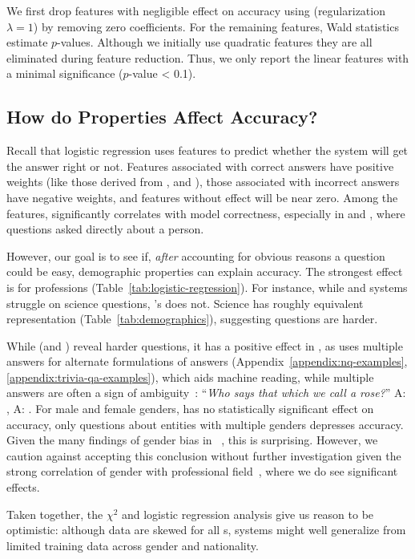 We first drop features with negligible effect on accuracy using \lasso{} (regularization $\lambda=1$) by removing  zero coefficients.
For the remaining features, Wald statistics~\cite{fahrmeir2007regression} estimate $p$-values. 
Although we initially use quadratic features they are all eliminated during feature reduction.
Thus, we only report the linear features with a minimal significance ($p$-value < 0.1).



\subsection{How do Properties Affect Accuracy?}

Recall that logistic regression uses features to predict whether the  system will get the answer right or not.
Features associated with correct answers have positive weights (like those derived from \citet{sugawara-18},  and ), those associated with incorrect answers have negative weights, and features without effect will be near zero.
Among the  features,  significantly correlates with model correctness, especially in \nq{} and \qb{}, where questions asked directly about a person. 

However, our goal is to see if, \emph{after} accounting for obvious reasons a question could be easy, demographic properties can explain  accuracy. 
The strongest effect is for professions (Table~\ref{tab:logistic-regression}).
For instance, while \nq{} and \qb{} systems struggle on science questions, \triviaqa{}'s does not.
Science has roughly equivalent representation (Table~\ref{tab:demographics}), suggesting \qb{} questions are harder.

While  (and ) reveal harder \nq{} questions, it has a positive effect in \triviaqa{}, as \triviaqa{} uses multiple answers for alternate formulations of answers (Appendix~\ref{appendix:nq-examples}, \ref{appendix:trivia-qa-examples}), which aids machine reading, while multiple  answers are often a sign of ambiguity~\cite{Boyd-Graber-20, Si:Zhao:Boyd-Graber-2021}:
``\emph{Who says that which we call a rose?}'' A: , A: .
For male and female genders, \nq{} has no statistically significant effect on accuracy, only questions about entities with multiple genders depresses accuracy.
Given the many findings of gender bias in ~\cite{zhao-17,webster-18,zhao-18,stanovsky-19}, this is surprising.
However, we caution against accepting this conclusion without further investigation given the strong correlation of gender with professional field~\cite{goulden-11}, where we do see significant effects. 

Taken together, the $\chi^{2}$ and logistic regression analysis give us reason to be optimistic: 
although data are skewed for all \demosubset{}s,  systems might well generalize from limited training data across gender and nationality.
